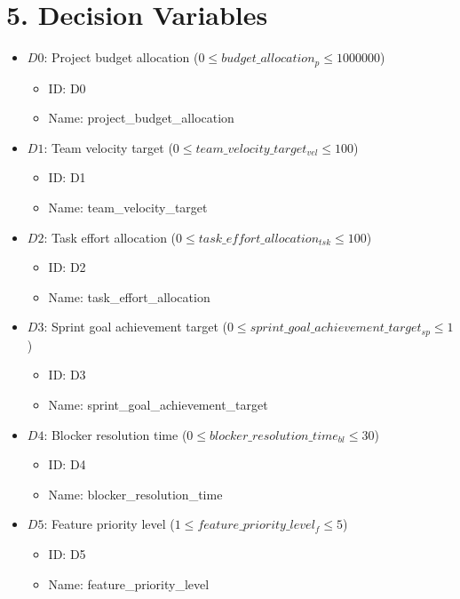\documentclass{article}
\begin{document}
\section{5. Decision Variables}
\begin{itemize}
    \item $D0$: Project budget allocation ($0 \leq budget\_allocation_p \leq 1000000$)
        \begin{itemize}
            \item ID: D0
            \item Name: project\_budget\_allocation
        \end{itemize}
    \item $D1$: Team velocity target ($0 \leq team\_velocity\_target_{vel} \leq 100$)
        \begin{itemize}
            \item ID: D1
            \item Name: team\_velocity\_target
        \end{itemize}
    \item $D2$: Task effort allocation ($0 \leq task\_effort\_allocation_{tsk} \leq 100$)
        \begin{itemize}
            \item ID: D2
            \item Name: task\_effort\_allocation
        \end{itemize}
    \item $D3$: Sprint goal achievement target ($0 \leq sprint\_goal\_achievement\_target_{sp} \leq 1$)
        \begin{itemize}
            \item ID: D3
            \item Name: sprint\_goal\_achievement\_target
        \end{itemize}
    \item $D4$: Blocker resolution time ($0 \leq blocker\_resolution\_time_{bl} \leq 30$)
        \begin{itemize}
            \item ID: D4
            \item Name: blocker\_resolution\_time
        \end{itemize}
    \item $D5$: Feature priority level ($1 \leq feature\_priority\_level_f \leq 5$)
        \begin{itemize}
            \item ID: D5
            \item Name: feature\_priority\_level

\end{itemize}
\end{itemize}
\end{document}
